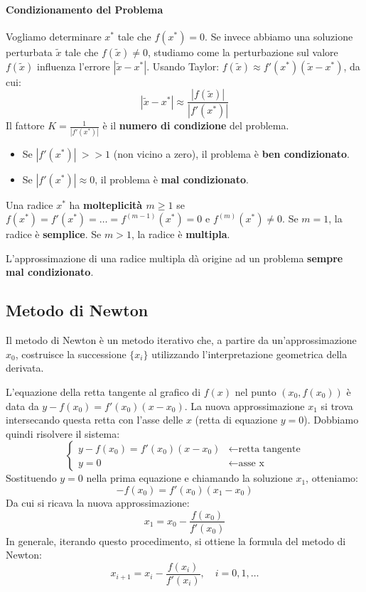 \paragraph{Condizionamento del Problema}
Vogliamo determinare $x^*$ tale che $f(x^*) = 0$. Se invece abbiamo una soluzione perturbata $\tilde{x}$ tale che $f(\tilde{x}) \neq 0$, studiamo come la perturbazione sul valore $f(\tilde{x})$ influenza l'errore $|\tilde{x} - x^*|$.
Usando Taylor: $f(\tilde{x}) \approx f'(x^*)(\tilde{x} - x^*)$, da cui:
$$ |\tilde{x} - x^*| \approx \frac{|f(\tilde{x})|}{|f'(x^*)|} $$
Il fattore $K = \frac{1}{|f'(x^*)|}$ è il \textbf{numero di condizione} del problema.
\begin{itemize}
    \item Se $|f'(x^*)| \ >> 1$ (non vicino a zero), il problema è \textbf{ben condizionato}.
    \item Se $|f'(x^*)| \approx 0$, il problema è \textbf{mal condizionato}.
\end{itemize}

\begin{definition}
Una radice $x^*$ ha \textbf{molteplicità $m \ge 1$} se $f(x^*) = f'(x^*) = \dots = f^{(m-1)}(x^*) = 0$ e $f^{(m)}(x^*) \neq 0$.
Se $m=1$, la radice è \textbf{semplice}. Se $m>1$, la radice è \textbf{multipla}.
\end{definition}

\begin{osservazione}
L'approssimazione di una radice multipla dà origine ad un problema \textbf{sempre mal condizionato}.
\end{osservazione}

\subsection{Metodo di Newton}
Il metodo di Newton è un metodo iterativo che, a partire da un'approssimazione $x_0$, costruisce la successione $\{x_i\}$ utilizzando l'interpretazione geometrica della derivata.

L'equazione della retta tangente al grafico di $f(x)$ nel punto $(x_0, f(x_0))$ è data da $y - f(x_0) = f'(x_0)(x - x_0)$. La nuova approssimazione $x_1$ si trova intersecando questa retta con l'asse delle $x$ (retta di equazione $y=0$). Dobbiamo quindi risolvere il sistema:
\[
\begin{cases} 
y - f(x_0) = f'(x_0)(x - x_0) & \leftarrow \text{retta tangente} \\
y = 0 & \leftarrow \text{asse x}
\end{cases}
\]
Sostituendo $y=0$ nella prima equazione e chiamando la soluzione $x_1$, otteniamo:
$$ -f(x_0) = f'(x_0)(x_1 - x_0) $$
Da cui si ricava la nuova approssimazione:
$$ x_1 = x_0 - \frac{f(x_0)}{f'(x_0)} $$
In generale, iterando questo procedimento, si ottiene la formula del metodo di Newton:
$$ x_{i+1} = x_i - \frac{f(x_i)}{f'(x_i)}, \quad i=0, 1, \dots $$

